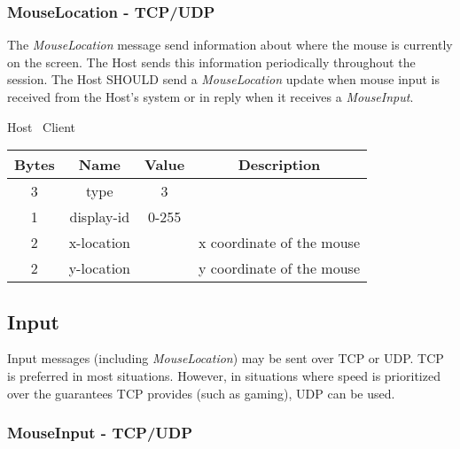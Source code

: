 \subsubsection{MouseLocation - TCP/UDP}

The \emph{MouseLocation} message send information about where the mouse is currently on the screen.
The Host sends this information periodically throughout the session.
The Host SHOULD send a \emph{MouseLocation} update when mouse input is received from the Host's system or in
reply when it receives a \emph{MouseInput}.

\begin{center}
    Host \textrightarrow\ Client\\
    \begin{tabular}{|c|c|c|c|}
        \hline
        \textbf{Bytes} & \textbf{Name} & \textbf{Value} & \textbf{Description}      \\
        \hline
        3              & type          & 3              &                           \\
        \hline
        1              & display-id    & 0-255          &                           \\
        \hline
        2              & x-location    &                & x coordinate of the mouse \\
        \hline
        2              & y-location    &                & y coordinate of the mouse \\
        \hline
    \end{tabular}
\end{center}

\subsection{Input}

Input messages (including \emph{MouseLocation}) may be sent over TCP or UDP. TCP is preferred in most situations.
However, in situations where speed is prioritized over the guarantees TCP provides (such as gaming), UDP can be
used.

\subsubsection{MouseInput - TCP/UDP}

